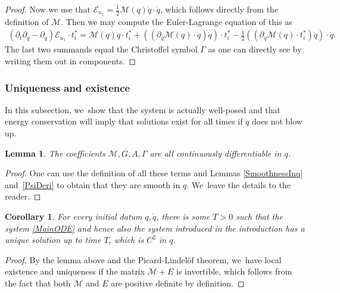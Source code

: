 \documentclass[10pt]{amsart}
\newtheorem{corollary}[theorem]{Corollary}
\newtheorem{lemma}[theorem]{Lemma}
\theoremstyle{definition}
\newcommand\eq{=}
\let\de\partial
\begin{document}
\begin{proof}
Now we use that $\mathcal{E}_{u_1}=\frac{1}{2}\mathcal{M}(q)\dot{q}\cdot\dot{q}$, which follows directly from the definition of $\mathcal{M}$. Then we may compute the Euler-Lagrange equation of this as
\begin{align*}
(\de_t\de_{\dot{q}}-\de_{q})\mathcal{E}_{u_1}\cdot t_i^*\eq \mathcal{M}(q)\ddot{q}\cdot t_i^*+((\de_q\mathcal{M}(q)\cdot \dot{q})\dot{q})\cdot t_i^*-\frac{1}{2}((\de_q\mathcal{M}(q)\cdot t_i^*)\dot{q})\cdot\dot{q}.
\end{align*}
The last two summands equal the Christoffel symbol $\Gamma$ as one can directly see by writing them out in components.
\end{proof}

\subsubsection{Uniqueness and existence}
In this subsection, we~show that the system is actually well-posed and that energy conservation will imply that solutions exist for all times if $q$ does not blow up.

\begin{lemma}
The coefficients $\mathcal{M},G,A, \Gamma$ are all continuously differentiable in $q$.
\end{lemma}
\begin{proof}
One can use the definition of all these terms and Lemmas \ref{SmoothnessInq} and~\ref{PsiDeri} to obtain that they are smooth in $q$. We~leave the details to the reader.
\end{proof}

\begin{corollary}
\label{Cor:Exist} For every initial datum $q,\dot{q}$, there is some $T>0$ such that the system \eqref{MainODE} and hence also the system introduced in the introduction has a unique solution up to time $T$, which is $C^2$ in $q$.
\end{corollary}
\begin{proof}
By the lemma above and the Picard-Lindelöf theorem, we~have local existence and uniqueness if the matrix $\mathcal{M}+E$ is invertible, which follows from the fact that both $\mathcal{M}$ and $E$ are positive definite by definition.
\end{proof}
\end{document}
